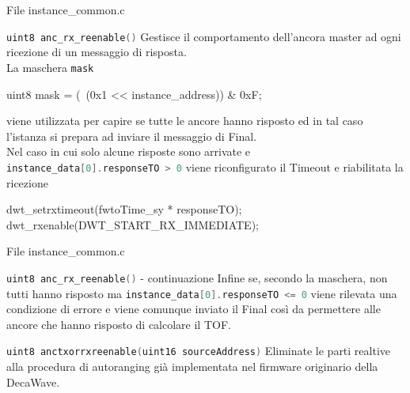 \begin{frame}[fragile, shirnk=30]{File instance\_common.c}
  \begin{block}{\lstinline[language=C]!uint8 anc_rx_reenable()!}
    Gestisce il comportamento dell'ancora master ad ogni ricezione di un messaggio di risposta.\\
    La maschera \lstinline[language=C]!mask!
    \begin{C}
    uint8 mask = (~(0x1 << instance_address)) & 0xF;
    \end{C}
    viene utilizzata per capire se tutte le ancore hanno risposto ed in tal caso l'istanza si prepara ad inviare il messaggio di Final.\\
    Nel caso in cui solo alcune risposte sono arrivate e \lstinline[language=C]!instance_data[0].responseTO > 0! viene riconfigurato il Timeout e riabilitata
    la ricezione 
    \begin{C}
    dwt_setrxtimeout(fwtoTime_sy * responseTO); 
    dwt_rxenable(DWT_START_RX_IMMEDIATE);
    \end{C}
  \end{block}
\end{frame}

\begin{frame}{File instance\_common.c}
  \begin{block}{\lstinline[language=C]!uint8 anc_rx_reenable()! - continuazione}
    Infine se, secondo la maschera, non tutti hanno risposto ma \lstinline[language=C]!instance_data[0].responseTO <= 0! viene
    rilevata una condizione di errore e viene comunque inviato il Final così da permettere alle ancore che hanno risposto di calcolare il TOF.
  \end{block}
  \begin{block}{\lstinline[language=C]!uint8 anctxorrxreenable(uint16 sourceAddress)!}
    Eliminate le parti realtive alla procedura di autoranging già implementata nel firmware originario della DecaWave.
  \end{block}
\end{frame}

